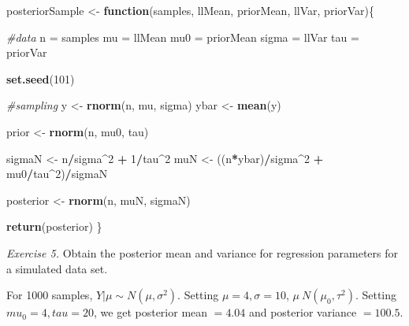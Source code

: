 \documentclass[]{article}
\newenvironment{Shaded}{\begin{snugshade}}{\end{snugshade}}
\newcommand{\CommentTok}[1]{\textcolor[rgb]{0.56,0.35,0.01}{\textit{#1}}}
\newcommand{\ControlFlowTok}[1]{\textcolor[rgb]{0.13,0.29,0.53}{\textbf{#1}}}
\newcommand{\DecValTok}[1]{\textcolor[rgb]{0.00,0.00,0.81}{#1}}
\newcommand{\KeywordTok}[1]{\textcolor[rgb]{0.13,0.29,0.53}{\textbf{#1}}}
\newcommand{\NormalTok}[1]{#1}
\newcommand{\OperatorTok}[1]{\textcolor[rgb]{0.81,0.36,0.00}{\textbf{#1}}}
\newcommand{\StringTok}[1]{\textcolor[rgb]{0.31,0.60,0.02}{#1}}
\begin{document}
\begin{Shaded}
\begin{Highlighting}[]
\NormalTok{posteriorSample <-}\StringTok{ }\ControlFlowTok{function}\NormalTok{(samples, llMean, priorMean, llVar, priorVar)\{}

\CommentTok{#data  }
\NormalTok{n =}\StringTok{ }\NormalTok{samples}
\NormalTok{mu =}\StringTok{ }\NormalTok{llMean}
\NormalTok{mu0 =}\StringTok{ }\NormalTok{priorMean}
\NormalTok{sigma =}\StringTok{ }\NormalTok{llVar}
\NormalTok{tau =}\StringTok{ }\NormalTok{priorVar }

\KeywordTok{set.seed}\NormalTok{(}\DecValTok{101}\NormalTok{)}

\CommentTok{#sampling}
\NormalTok{y <-}\StringTok{ }\KeywordTok{rnorm}\NormalTok{(n, mu, sigma)}
\NormalTok{ybar <-}\StringTok{ }\KeywordTok{mean}\NormalTok{(y)}

\NormalTok{prior <-}\StringTok{ }\KeywordTok{rnorm}\NormalTok{(n, mu0, tau)}

\NormalTok{sigmaN <-}\StringTok{ }\NormalTok{n}\OperatorTok{/}\NormalTok{sigma}\OperatorTok{^}\DecValTok{2} \OperatorTok{+}\StringTok{ }\DecValTok{1}\OperatorTok{/}\NormalTok{tau}\OperatorTok{^}\DecValTok{2}
\NormalTok{muN <-}\StringTok{ }\NormalTok{((n}\OperatorTok{*}\NormalTok{ybar)}\OperatorTok{/}\NormalTok{sigma}\OperatorTok{^}\DecValTok{2} \OperatorTok{+}\StringTok{ }\NormalTok{mu0}\OperatorTok{/}\NormalTok{tau}\OperatorTok{^}\DecValTok{2}\NormalTok{)}\OperatorTok{/}\NormalTok{sigmaN}

\NormalTok{posterior <-}\StringTok{ }\KeywordTok{rnorm}\NormalTok{(n, muN, sigmaN)}

\KeywordTok{return}\NormalTok{(posterior)}
\NormalTok{\}}
\end{Highlighting}
\end{Shaded}

\emph{Exercise 5.} Obtain the posterior mean and variance for regression
parameters for a simulated data set.

For 1000 samples, \(Y|\mu \sim N(\mu, \sigma^2)\). Setting
\(\mu = 4, \sigma = 10\), \(\mu ~ N(\mu_0, \tau^2)\). Setting
\(mu_0= 4, tau = 20\), we get posterior mean \(= 4.04\) and posterior
variance \(= 100.5\).
\end{document}
